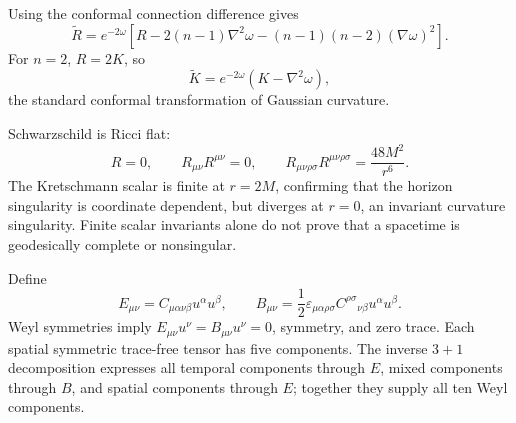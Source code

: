 \begin{solution}
Using the conformal connection difference gives
\[
\widetilde R=e^{-2\omega}\left[
R-2(n-1)\nabla^2\omega
-(n-1)(n-2)(\nabla\omega)^2\right].
\]
For \(n=2\), \(R=2K\), so
\[
\widetilde K=e^{-2\omega}(K-\nabla^2\omega),
\]
the standard conformal transformation of Gaussian curvature.
\end{solution}

\begin{solution}
Schwarzschild is Ricci flat:
\[
R=0,\qquad R_{\mu\nu}R^{\mu\nu}=0,
\qquad
R_{\mu\nu\rho\sigma}R^{\mu\nu\rho\sigma}
=\frac{48M^2}{r^6}.
\]
The Kretschmann scalar is finite at \(r=2M\), confirming that the horizon
singularity is coordinate dependent, but diverges at \(r=0\), an invariant
curvature singularity.  Finite scalar invariants alone do not prove that a
spacetime is geodesically complete or nonsingular.
\end{solution}

\begin{solution}
Define
\[
E_{\mu\nu}=C_{\mu\alpha\nu\beta}u^\alpha u^\beta,\qquad
B_{\mu\nu}=\frac12\varepsilon_{\mu\alpha\rho\sigma}
C^{\rho\sigma}{}_{\nu\beta}u^\alpha u^\beta.
\]
Weyl symmetries imply \(E_{\mu\nu}u^\nu=B_{\mu\nu}u^\nu=0\), symmetry, and
zero trace.  Each spatial symmetric trace-free tensor has five components.
The inverse \(3+1\) decomposition expresses all temporal components through
\(E\), mixed components through \(B\), and spatial components through \(E\);
together they supply all ten Weyl components.
\end{solution}
